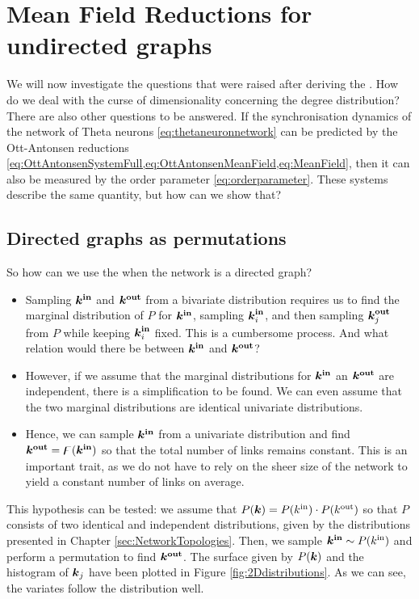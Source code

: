 \newpage
\section{\mywork Mean Field Reductions for undirected graphs} \label{sec:MFRSUndirected}
We will now investigate the questions that were raised after deriving the \MFR. How do we deal with the curse of dimensionality concerning the degree distribution? There are also other questions to be answered. If the synchronisation dynamics of the network of Theta neurons \eqref{eq:thetaneuronnetwork} can be predicted by the Ott-Antonsen reductions \cref{eq:OttAntonsenSystemFull,eq:OttAntonsenMeanField,eq:MeanField}, then it can also be measured by the order parameter \eqref{eq:orderparameter}. These systems describe the same quantity, but how can we show that?


\subsection{Directed graphs as permutations}
So how can we use the \MFR when the network is a directed graph?
\begin{itemize}
\item Sampling ${\boldsymbol{k^{\rm in}}}$ and $\boldsymbol{{k^{\rm out}}}$ from a bivariate distribution requires us to find the marginal distribution of $P$ for ${\boldsymbol{k^{\rm in}}}$, sampling ${\boldsymbol{k}_i^{\bf in}}$, and then sampling ${\boldsymbol{k}_j^{\bf out}}$ from $P$ while keeping ${\boldsymbol{k}_i^{\bf in}}$ fixed. This is a cumbersome process. And what relation would there be between ${\boldsymbol{k^{\rm in}}}$ and $\boldsymbol{{k^{\rm out}}}$?
\item However, if we assume that the marginal distributions for ${\boldsymbol{k^{\rm in}}}$ an $\boldsymbol{{k^{\rm out}}}$ are independent, there is a simplification to be found. We can even assume that the two marginal distributions are identical univariate distributions. 
\item Hence, we can sample ${\boldsymbol{k^{\rm in}}}$ from a univariate distribution and find $\boldsymbol{{k^{\rm out}}} = {\digamma} ( {\boldsymbol{k^{\rm in}}} )$ so that the total number of links remains constant. This is an important trait, as we do not have to rely on the sheer size of the network to yield a constant number of links on average.
\end{itemize}

This hypothesis can be tested: we assume that $P({\boldsymbol{k}}) = P({k^{\rm in}}) \cdot P({k^{\rm out}})$ so that $P$ consists of two identical and independent distributions, given by the distributions presented in Chapter \ref{sec:NetworkTopologies}. Then, we sample ${\boldsymbol{k^{\rm in}}} \sim P({k^{\rm in}})$ and perform a permutation to find $\boldsymbol{{k^{\rm out}}}$. The surface given by $P({\boldsymbol{k}})$ and the histogram of ${\boldsymbol{k}}_j$ have been plotted in Figure \ref{fig:2Ddistributions}. As we can see, the variates follow the distribution well. 

